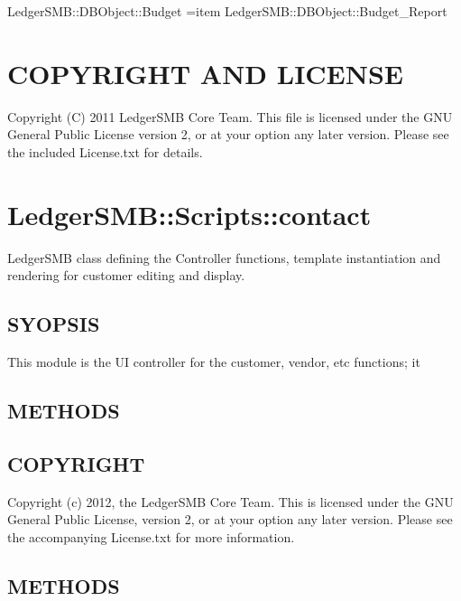 \begin{description}
\begin{description}
\item[{LedgerSMB::DBObject::Budget =item LedgerSMB::DBObject::Budget\_Report}] \mbox{}\end{description}
\section{COPYRIGHT AND LICENSE\label{COPYRIGHT_AND_LICENSE}}


Copyright (C) 2011 LedgerSMB Core Team.  This file is licensed under the GNU 
General Public License version 2, or at your option any later version.  Please
see the included License.txt for details.

\section{LedgerSMB::Scripts::contact\label{LedgerSMB::Scripts::contact}}


LedgerSMB class defining the Controller
functions, template instantiation and rendering for customer editing and display.

\subsection*{SYOPSIS\label{LedgerSMB::Scripts::contact_SYOPSIS}}


This module is the UI controller for the customer, vendor, etc functions; it

\subsection*{METHODS\label{LedgerSMB::Scripts::contact_METHODS}}
\subsection*{COPYRIGHT\label{LedgerSMB::Scripts::contact_COPYRIGHT}}


Copyright (c) 2012, the LedgerSMB Core Team.  This is licensed under the GNU 
General Public License, version 2, or at your option any later version.  Please 
see the accompanying License.txt for more information.

\subsection*{METHODS\label{LedgerSMB::Scripts::contact_METHODS}}
\begin{description}


\end{description}
\end{description}
